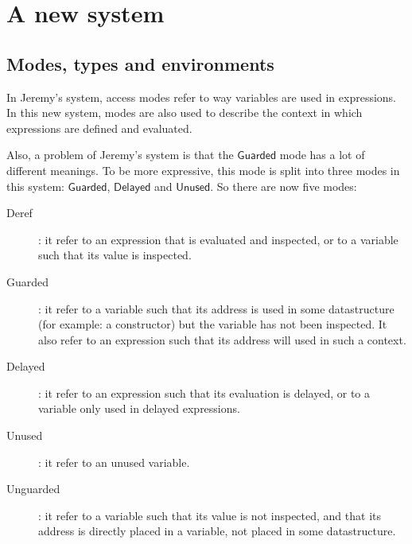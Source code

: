 \documentclass{article}
\newcommand{\Guarded}{\mathsf{Guarded}}
\newcommand{\Delayed}{\mathsf{Delayed}}
\newcommand{\Unused}{\mathsf{Unused}}
\begin{document}

\section{A new system}


\subsection{Modes, types and environments}
In Jeremy's system, access modes refer to way variables are used in expressions.
In this new system, modes are also used to describe the context in which
expressions are defined and evaluated.

Also, a problem of Jeremy's system is that the $\Guarded$ mode has a lot of
different meanings. To be more expressive, this mode is split into three modes
in this system: $\Guarded$, $\Delayed$ and $\Unused$. So there are now five
modes:

\begin{description}
  \item[Deref]: it refer to an expression that is evaluated and inspected, or to
    a variable such that its value is inspected.
  \item[Guarded]: it refer to a variable such that its address is used in some
    datastructure (for example: a constructor) but the variable has not been
    inspected. It also refer to an expression such that its address will used
    in such a context.
  \item[Delayed]: it refer to an expression such that its evaluation is delayed,
    or to a variable only used in delayed expressions.
  \item[Unused]: it refer to an unused variable.
  \item[Unguarded]: it refer to a variable such that its value is not inspected,
    and that its address is directly placed in a variable, not placed in some
    datastructure.
\end{description}
\end{document}
